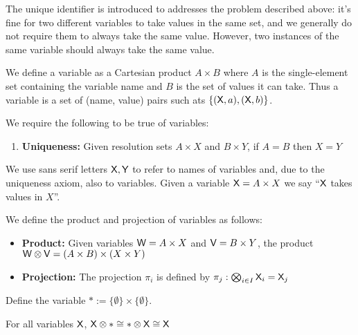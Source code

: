 The unique identifier is introduced to addresses the problem described above: it's fine for two different variables to take values in the same set, and we generally do not require them to always take the same value. However, two instances of the same variable should always take the same value.

We define a variable as a Cartesian product $A\times B$ where $A$ is the single-element set containing the variable name and $B$ is the set of values it can take. Thus a variable is a set of (name, value) pairs such ats $\{(\mathsf{X},a),(\mathsf{X},b)\}$.

We require the following to be true of variables:

\begin{enumerate}
	\item \textbf{Uniqueness:} Given resolution sets $A\times X$ and $B\times Y$, if $A=B$ then $X=Y$
\end{enumerate}

We use sans serif letters $\mathsf{X},\mathsf{Y}$ to refer to names of variables and, due to the uniqueness axiom, also to variables. Given a variable $\mathsf{X}=A\times X$ we say ``$\mathsf{X}$ takes values in $X$''.


We define the product and projection of variables as follows:

\begin{itemize}
	\item \textbf{Product:} Given variables $\mathsf{W}=A\times X$ and $\mathsf{V}=B\times Y$, the product $\mathsf{W}\otimes\mathsf{V}=(A\times B)\times (X\times Y)$
	\item \textbf{Projection:} The projection $\pi_i$ is defined by $\pi_j:\bigotimes_{i\in I} \mathsf{X}_i = \mathsf{X}_j$
\end{itemize}



Define the variable $*:=\{\emptyset\}\times\{\emptyset\}$.

\begin{lemma}\label{lem:se_id}
For all variables $\mathsf{X}$, $\mathsf{X}\otimes * \cong *\otimes \mathsf{X} \cong \mathsf{X}$
\end{lemma}

